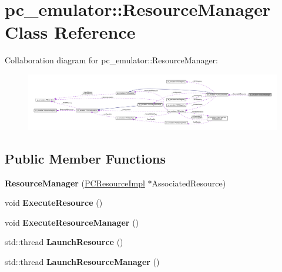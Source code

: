 \hypertarget{classpc__emulator_1_1ResourceManager}{}\section{pc\+\_\+emulator\+:\+:Resource\+Manager Class Reference}
\label{classpc__emulator_1_1ResourceManager}


Collaboration diagram for pc\+\_\+emulator\+:\+:Resource\+Manager\+:\nopagebreak
\begin{figure}[H]
\begin{center}
\leavevmode
\includegraphics[width=350pt]{classpc__emulator_1_1ResourceManager__coll__graph}
\end{center}
\end{figure}
\subsection*{Public Member Functions}
\begin{DoxyCompactItemize}
\item 
{\bfseries Resource\+Manager} (\hyperlink{classpc__emulator_1_1PCResourceImpl}{P\+C\+Resource\+Impl} $\ast$Associated\+Resource)\hypertarget{classpc__emulator_1_1ResourceManager_a342411d8f20e1a25699b9b3ada2968dc}{}\label{classpc__emulator_1_1ResourceManager_a342411d8f20e1a25699b9b3ada2968dc}

\item 
void {\bfseries Execute\+Resource} ()\hypertarget{classpc__emulator_1_1ResourceManager_a8f3e065bf68a40e88b8e1dc71e70480d}{}\label{classpc__emulator_1_1ResourceManager_a8f3e065bf68a40e88b8e1dc71e70480d}

\item 
void {\bfseries Execute\+Resource\+Manager} ()\hypertarget{classpc__emulator_1_1ResourceManager_ad1ca07861c6f5a276c76a11fc5255c21}{}\label{classpc__emulator_1_1ResourceManager_ad1ca07861c6f5a276c76a11fc5255c21}

\item 
std\+::thread {\bfseries Launch\+Resource} ()\hypertarget{classpc__emulator_1_1ResourceManager_aaee2535ac7c878169d7f32fa7fa344fe}{}\label{classpc__emulator_1_1ResourceManager_aaee2535ac7c878169d7f32fa7fa344fe}

\item 
std\+::thread {\bfseries Launch\+Resource\+Manager} ()\hypertarget{classpc__emulator_1_1ResourceManager_aae39d5ff38fbc3475f816826952c81c8}{}\label{classpc__emulator_1_1ResourceManager_aae39d5ff38fbc3475f816826952c81c8}

\end{DoxyCompactItemize}
